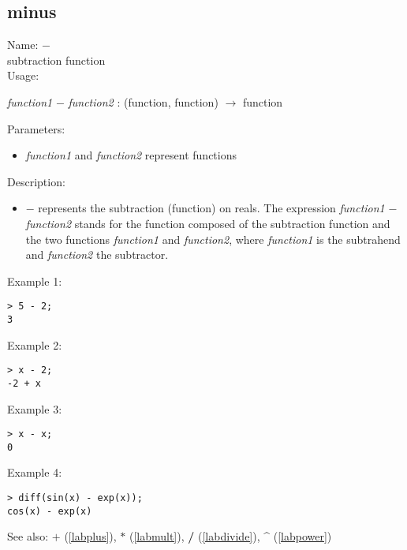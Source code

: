 \subsection{minus}
\label{labminus}
\noindent Name: \textbf{$-$}\\
subtraction function\\
\noindent Usage: 
\begin{center}
\emph{function1} \textbf{$-$} \emph{function2} : (\textsf{function}, \textsf{function}) $\rightarrow$ \textsf{function}
\\ 
\end{center}
Parameters: 
\begin{itemize}
\item \emph{function1} and \emph{function2} represent functions
\end{itemize}
\noindent Description: \begin{itemize}

\item \textbf{$-$} represents the subtraction (function) on reals. 
   The expression \emph{function1} \textbf{$-$} \emph{function2} stands for
   the function composed of the subtraction function and the two
   functions \emph{function1} and \emph{function2}, where \emph{function1} is 
   the subtrahend and \emph{function2} the subtractor.
\end{itemize}
\noindent Example 1: 
\begin{center}\begin{minipage}{15cm}\begin{Verbatim}[frame=single]
> 5 - 2;
3
\end{Verbatim}
\end{minipage}\end{center}
\noindent Example 2: 
\begin{center}\begin{minipage}{15cm}\begin{Verbatim}[frame=single]
> x - 2;
-2 + x
\end{Verbatim}
\end{minipage}\end{center}
\noindent Example 3: 
\begin{center}\begin{minipage}{15cm}\begin{Verbatim}[frame=single]
> x - x;
0
\end{Verbatim}
\end{minipage}\end{center}
\noindent Example 4: 
\begin{center}\begin{minipage}{15cm}\begin{Verbatim}[frame=single]
> diff(sin(x) - exp(x));
cos(x) - exp(x)
\end{Verbatim}
\end{minipage}\end{center}
See also: \textbf{$+$} (\ref{labplus}), \textbf{$*$} (\ref{labmult}), \textbf{/} (\ref{labdivide}), \textbf{\^} (\ref{labpower})
